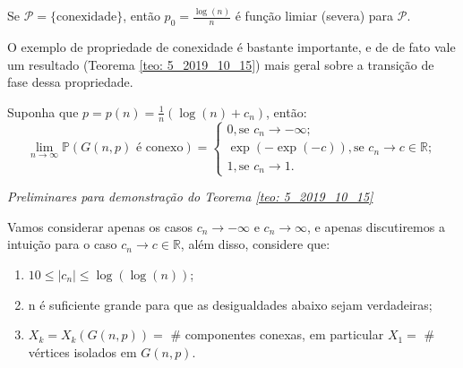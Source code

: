\begin{exemplo}
Se $\mathcal{P} = \{\text{conexidade}\}$, então $p_0 = \frac{\log(n)}{n}$ é função limiar (severa) para $\mathcal{P}$.
\end{exemplo}

O exemplo de propriedade de conexidade é bastante importante, e de de fato vale um resultado (Teorema \ref{teo: 5_2019_10_15}) mais geral sobre a transição de fase dessa propriedade.
\begin{teorema}
\label{teo: 5_2019_10_15}
Suponha que $p = p(n) = \frac{1}{n}(\log(n) + c_n)$, então:
\begin{equation*}
    \lim_{n \rightarrow \infty} \mathbb{P}(G(n, p) \text{ é conexo}) = \begin{cases}
    0, \text{se } c_n \rightarrow - \infty ;\\
    \exp(-\exp(-c)), \text{se } c_n \rightarrow c \in \mathbb{R} ;\\
    1, \text{se } c_n \rightarrow 1.
    \end{cases}    
\end{equation*}
\end{teorema}

\emph{Preliminares para demonstração do Teorema \ref{teo: 5_2019_10_15}}

Vamos considerar apenas os casos $c_n \rightarrow -\infty$ e $c_n \rightarrow \infty$, e apenas discutiremos a intuição para o caso $c_n \rightarrow c \in \mathbb{R}$, além disso, considere que:
\begin{enumerate}
    \item $10 \leq |c_n| \leq \log(\log(n))$;
    \item n é suficiente grande para que as desigualdades abaixo sejam verdadeiras;
    \item $X_k = X_k(G(n,p)) =$ \# componentes conexas, em particular $X_1 = $ \# vértices isolados em $G(n,p)$.
\end{enumerate}{}


